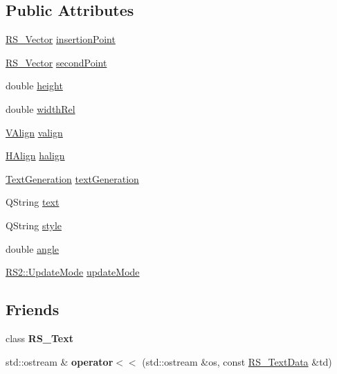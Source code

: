 \subsection*{Public Attributes}
\begin{DoxyCompactItemize}
\item 
\hyperlink{classRS__Vector}{R\-S\-\_\-\-Vector} \hyperlink{classRS__TextData_a0505846c1555d91ead9187793430412f}{insertion\-Point}
\item 
\hyperlink{classRS__Vector}{R\-S\-\_\-\-Vector} \hyperlink{classRS__TextData_a4170b2d8d3cdca3673bb310c38df5e9b}{second\-Point}
\item 
double \hyperlink{classRS__TextData_a93af79f53dbc2249b7cc831c946ec340}{height}
\item 
double \hyperlink{classRS__TextData_a9441dd6298da8738c3d9de5e8ebfa650}{width\-Rel}
\item 
\hyperlink{classRS__TextData_ac2501fdff1871b36025d584099ab51d1}{V\-Align} \hyperlink{classRS__TextData_a11c12106c3385ad3377e1cb8fa98d6fc}{valign}
\item 
\hyperlink{classRS__TextData_a70932aa9cb36e3b9cc11dc1029d3146d}{H\-Align} \hyperlink{classRS__TextData_acc4b864991c706dcfdb2431f33fae240}{halign}
\item 
\hyperlink{classRS__TextData_a1abf0a4dfba0000c09a599aa059f5fa0}{Text\-Generation} \hyperlink{classRS__TextData_ac0a610f44a6e4c236068318caad84c02}{text\-Generation}
\item 
Q\-String \hyperlink{classRS__TextData_a7594aceaa8b50686d8244f854e09f875}{text}
\item 
Q\-String \hyperlink{classRS__TextData_a5ff7d519c1cbfa01ac4024225c0b458e}{style}
\item 
double \hyperlink{classRS__TextData_a14fbd2a26d412ff209f4545b23dc60ef}{angle}
\item 
\hyperlink{classRS2_ab05150052f314f729c76afff34f89bc5}{R\-S2\-::\-Update\-Mode} \hyperlink{classRS__TextData_ae0bec40e64eadd73083164e0fa40d687}{update\-Mode}
\end{DoxyCompactItemize}
\subsection*{Friends}
\begin{DoxyCompactItemize}
\item 
\hypertarget{classRS__TextData_ae1eeb92d48f7f6d2114116f738e4ab51}{class {\bfseries R\-S\-\_\-\-Text}}\label{classRS__TextData_ae1eeb92d48f7f6d2114116f738e4ab51}

\item 
\hypertarget{classRS__TextData_a43de2f4f88d801be34af4a5a44ee947b}{std\-::ostream \& {\bfseries operator$<$$<$} (std\-::ostream \&os, const \hyperlink{classRS__TextData}{R\-S\-\_\-\-Text\-Data} \&td)}\label{classRS__TextData_a43de2f4f88d801be34af4a5a44ee947b}

\end{DoxyCompactItemize}


